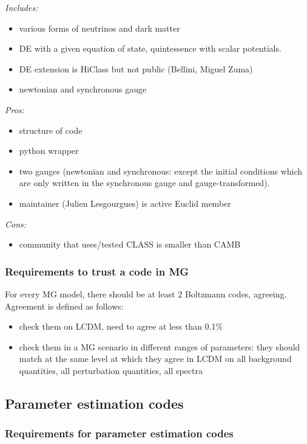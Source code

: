 {\it Includes:}
\begin{itemize}
 \item various forms of neutrinos and dark matter
 \item DE with a given equation of state, quintessence with scalar potentials.
 \item DE extension is HiClass but not public (Bellini, Miguel Zuma)
 \item newtonian and synchronous gauge
\end{itemize}
{\it Pros: }
\begin{itemize}
 \item structure of code
 \item python wrapper
 \item two gauges (newtonian and synchronous: except the initial conditions which are only written in the synchronous gauge and gauge-transformed). 
 \item maintainer (Julien Lesgourgues) is active Euclid member
\end{itemize}
{\it Cons: }
\begin{itemize}
 \item community that uses/tested CLASS is smaller than CAMB
\end{itemize}





\subsubsection{Requirements to trust a code in MG}

For every MG model, there should be at least 2 Boltzmann codes, agreeing. Agreement is defined as follows: 
\begin{itemize}
 \item check them on LCDM, need to agree at less than 0.1\%
 \item check them in a MG scenario in different ranges of parameters: they should match at the same level at which they agree in LCDM on 
all background quantities, all perturbation quantities, all spectra
\end{itemize}

 




\subsection{Parameter estimation codes}

\subsubsection{Requirements for parameter estimation codes}

